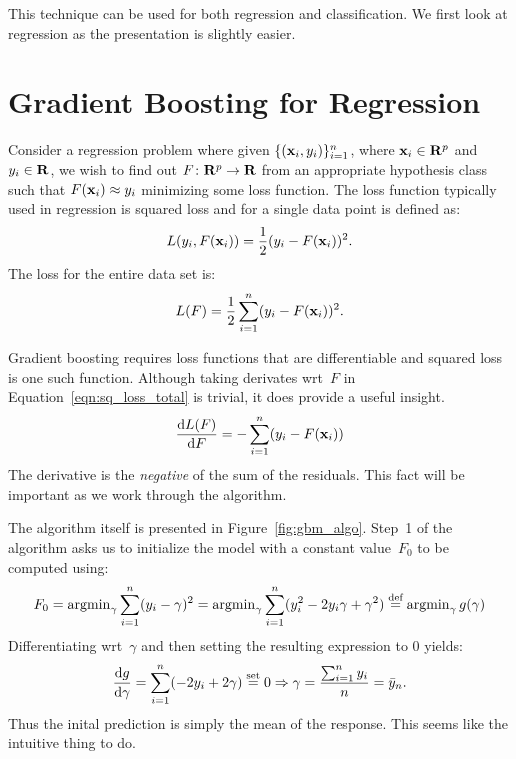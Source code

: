 This technique can be used for both regression and classification. We first look
at regression as the presentation is slightly easier.

\section{Gradient Boosting for Regression}
Consider a regression problem where given $\{ (\mathbf{x}_i, y_i)\}_{i = 1}^n$, 
where $\mathbf{x}_i \in \mathbf{R}^p$ and $y_i \in \mathbf{R}$, we wish to find out 
$F \colon \mathbf{R}^p \to \mathbf{R}$ from an appropriate hypothesis class 
such that $F(\mathbf{x}_i) \approx y_i$ minimizing some 
loss function. The loss function typically used in regression is squared loss
and for a single data point is defined as:
\begin{equation}  
    \label{eqn:sq_loss_single}
    L(y_i, F(\mathbf{x}_i)) = \frac{1}{2} (y_i - F(\mathbf{x}_i))^2. 
\end{equation}
The loss for the entire data set is:
\begin{equation}
    \label{eqn:sq_loss_total}
    L(F) = \frac{1}{2} \sum_{i = 1}^{n} (y_i - F(\mathbf{x}_i))^2.
\end{equation}

Gradient boosting requires loss functions that are differentiable and squared loss
is one such function. Although taking derivates wrt~$F$ 
in Equation~\ref{eqn:sq_loss_total} is trivial, it does provide a useful insight.
\begin{equation}
    \frac{\mathrm{d} L(F)}{\mathrm{d} F} 
        = - \sum_{i = 1}^n (y_i - F(\mathbf{x}_i))   
\end{equation}
The derivative is the \emph{negative} of the sum of the residuals. This fact 
will be important as we work through the algorithm.

The algorithm itself is presented in Figure~\ref{fig:gbm_algo}. Step~1 of the 
algorithm asks us to initialize the model with a constant value~$F_0$ 
to be computed using:
\begin{equation}
        F_0 
        = \operatorname{argmin}_{\gamma} \sum_{i = 1}^{n} (y_i - \gamma)^2
        = \operatorname{argmin}_{\gamma} \sum_{i = 1}^{n} (y_i^2 - 2 y_i \gamma + \gamma^2)
        \stackrel{\text{def}}{=} \operatorname{argmin}_{\gamma} g(\gamma)
\end{equation}
Differentiating wrt~$\gamma$ and then setting the resulting expression to $0$
yields:
\[
    \frac{\mathrm{d} g}{\mathrm{d} \gamma} = \sum_{i = 1}^{n} (-2 y_i + 2 \gamma) \stackrel{\text{set}}{=} 0
    \Rightarrow \gamma = \frac{\sum_{i = 1}^{n} y_i}{n} = \bar{y}_n.
\]
Thus the inital prediction is simply the mean of the response. This seems 
like the intuitive thing to do. 

